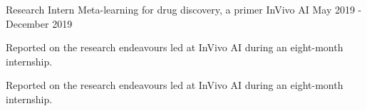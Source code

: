 

\begin{cventries}

  \cventry
    {Research Intern} %
    {Meta-learning for drug discovery, a primer} %
    {InVivo AI} %
    {May 2019 - December 2019} %
    {
      \begin{cvitems} %
        \item {Reported on the research endeavours led at InVivo AI during an eight-month internship.}
        \item {Reported on the research endeavours led at InVivo AI during an eight-month internship.}
      \end{cvitems}
    }

\end{cventries}

